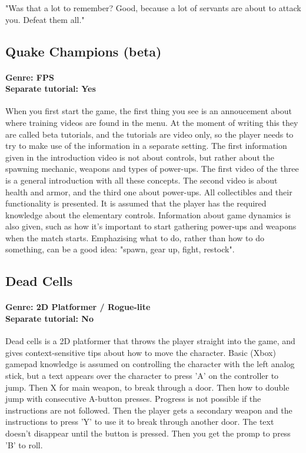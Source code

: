 "Was that a lot to remember?
Good, because a lot of servants are about to attack you.
Defeat them all."

\subsection{Quake Champions (beta)}
\paragraph{Genre: FPS \\ Separate tutorial: Yes \\}
When you first start the game, the first thing you see is an annoucement about
where training videos are found in the menu. At the moment of writing this
they are called beta tutorials, and the tutorials are video only, so the
player needs to try to make use of the information in a separate setting. The
first information given in the introduction video is not about controls, but
rather about the spawning mechanic, weapons and types of power-ups. The first
video of the three is a general introduction with all these concepts. The
second video is about health and armor, and the third one about power-ups.
All collectibles and their functionality is presented. It is assumed that the
player has the required knowledge about the elementary controls. Information about game dynamics is also given, such as how it's important to start gathering power-ups and weapons when the match starts. Emphazising what to do, rather than how to do something, can be a good idea: "spawn, gear up, fight, restock".

\subsection{Dead Cells}
\paragraph{Genre: 2D Platformer / Rogue-lite \\ Separate tutorial: No \\}
Dead cells is a 2D platformer that throws the player straight into the game, and gives context-sensitive tips about how to move the character. Basic (Xbox) gamepad knowledge is assumed on controlling the character with the left analog stick, but a text appears over the character to press 'A' on the controller to jump. Then X for main weapon, to break through a door. Then how to double jump with consecutive A-button presses. Progress is not possible if the instructions are not followed. Then the player gets a secondary weapon and the instructions to press 'Y' to use it to break through another door. The text doesn't disappear until the button is pressed. Then you get the promp to press 'B' to roll.

